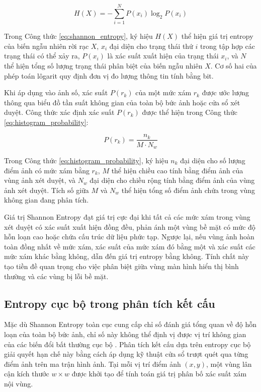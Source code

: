 \begin{equation}
H(X) = -\sum_{i=1}^{N} P(x_i) \log_2 P(x_i)
\label{eq:shannon_entropy}
\end{equation}

Trong Công thức \ref{eq:shannon_entropy}, ký hiệu $H(X)$ thể hiện giá trị entropy của biến ngẫu nhiên rời rạc $X$, $x_i$ đại diện cho trạng thái thứ $i$ trong tập hợp các trạng thái có thể xảy ra, $P(x_i)$ là xác suất xuất hiện của trạng thái $x_i$, và $N$ thể hiện tổng số lượng trạng thái phân biệt của biến ngẫu nhiên $X$. Cơ số hai của phép toán lôgarit quy định đơn vị đo lượng thông tin tính bằng bit.

Khi áp dụng vào ảnh số, xác suất $P(r_k)$ của một mức xám $r_k$ được ước lượng thông qua biểu đồ tần suất không gian của toàn bộ bức ảnh hoặc cửa sổ xét duyệt. Công thức xác định xác suất $P(r_k)$ được thể hiện trong Công thức \ref{eq:histogram_probability}:

\begin{equation}
P(r_k) = \frac{n_k}{M \cdot N_w}
\label{eq:histogram_probability}
\end{equation}

Trong Công thức \ref{eq:histogram_probability}, ký hiệu $n_k$ đại diện cho số lượng điểm ảnh có mức xám bằng $r_k$, $M$ thể hiện chiều cao tính bằng điểm ảnh của vùng ảnh xét duyệt, và $N_w$ đại diện cho chiều rộng tính bằng điểm ảnh của vùng ảnh xét duyệt. Tích số giữa $M$ và $N_w$ thể hiện tổng số điểm ảnh chứa trong vùng không gian đang phân tích.

Giá trị Shannon Entropy đạt giá trị cực đại khi tất cả các mức xám trong vùng xét duyệt có xác suất xuất hiện đồng đều, phản ánh một vùng bề mặt có mức độ hỗn loạn cao hoặc chứa cấu trúc dữ liệu phức tạp. Ngược lại, nếu vùng ảnh hoàn toàn đồng nhất về mức xám, xác suất của mức xám đó bằng một và xác suất các mức xám khác bằng không, dẫn đến giá trị entropy bằng không. Tính chất này tạo tiền đề quan trọng cho việc phân biệt giữa vùng màn hình hiển thị bình thường và các vùng bị lỗi bề mặt.

\subsection{Entropy cục bộ trong phân tích kết cấu}

Mặc dù Shannon Entropy toàn cục cung cấp chỉ số đánh giá tổng quan về độ hỗn loạn của toàn bộ bức ảnh, chỉ số này không thể định vị được vị trí không gian của các biến đổi bất thường cục bộ \cite{haralick1973textural}. Phân tích kết cấu dựa trên entropy cục bộ giải quyết hạn chế này bằng cách áp dụng kỹ thuật cửa sổ trượt quét qua từng điểm ảnh trên ma trận hình ảnh. Tại mỗi vị trí điểm ảnh $(x,y)$, một vùng lân cận kích thước $w \times w$ được khởi tạo để tính toán giá trị phân bố xác suất xám nội vùng.

